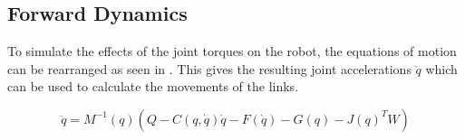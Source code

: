 \subsection{Forward Dynamics}
To simulate the effects of the joint torques on the robot, the equations of motion   can be rearranged as seen in . This gives the resulting joint accelerations $\ddot{q}$ which can be used to calculate the movements of the links.

\begin{equation} \label{eq:FWDyn}
	\ddot{q}= M^{-1}(q) (Q-C(q,\dot{q})\dot{q} - F(\dot{q}) -G(q) -J(q)^T W)
\end{equation}

